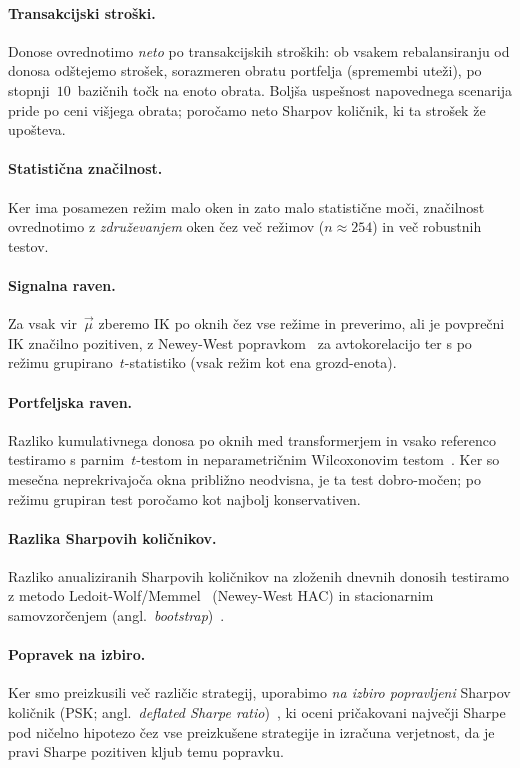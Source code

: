 \paragraph{Transakcijski stroški.} Donose ovrednotimo \emph{neto} po transakcijskih stroških: ob vsakem rebalansiranju od donosa odštejemo strošek, sorazmeren obratu portfelja (spremembi uteži), po stopnji~$10$~bazičnih točk na enoto obrata. Boljša uspešnost napovednega scenarija pride po ceni višjega obrata; poročamo neto Sharpov količnik, ki ta strošek že upošteva.

\paragraph{Statistična značilnost.}\label{sec:stat}
Ker ima posamezen režim malo oken in zato malo statistične moči, značilnost ovrednotimo z \emph{združevanjem} oken čez več režimov ($n\approx 254$) in več robustnih testov.

\paragraph{Signalna raven.} Za vsak vir~$\vec{\mu}$ zberemo IK po oknih čez vse režime in preverimo, ali je povprečni IK značilno pozitiven, z Newey-West popravkom~\cite{neweywest1987} za avtokorelacijo ter s po režimu grupirano~$t$-statistiko (vsak režim kot ena grozd-enota).

\paragraph{Portfeljska raven.} Razliko kumulativnega donosa po oknih med transformerjem in vsako referenco testiramo s parnim~$t$-testom in neparametričnim Wilcoxonovim testom~\cite{demiguel2009}. Ker so mesečna neprekrivajoča okna približno neodvisna, je ta test dobro-močen; po režimu grupiran test poročamo kot najbolj konservativen.

\paragraph{Razlika Sharpovih količnikov.} Razliko anualiziranih Sharpovih količnikov na zloženih dnevnih donosih testiramo z metodo Ledoit-Wolf/Memmel~\cite{ledoitwolf2008,memmel2003} (Newey-West HAC) in stacionarnim samovzorčenjem (angl.\ \emph{bootstrap})~\cite{politis1994}.

\paragraph{Popravek na izbiro.} Ker smo preizkusili več različic strategij, uporabimo \emph{na izbiro popravljeni} Sharpov količnik (PSK; angl.\ \emph{deflated Sharpe ratio})~\cite{baileylopez2014}, ki oceni pričakovani največji Sharpe pod ničelno hipotezo čez vse preizkušene strategije in izračuna verjetnost, da je pravi Sharpe pozitiven kljub temu popravku.


